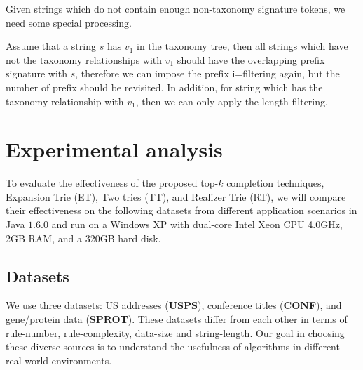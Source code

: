 \documentclass{sig-alternate}
\begin{document}
Given strings which do not contain enough non-taxonomy signature tokens, we need some special processing.

Assume that a string $s$ has $v_1$ in the taxonomy tree, then all strings which have not the taxonomy relationships with $v_1$ should have the overlapping prefix signature with $s$, therefore we can impose the prefix i=filtering again, but the number of prefix should be revisited. In addition, for string which has the taxonomy relationship with $v_1$, then we can only apply the length filtering.




\section{Experimental analysis}

To evaluate the effectiveness of the proposed top-$k$ completion
techniques, Expansion Trie (ET), Two tries (TT), and  Realizer Trie (RT), we will compare
their effectiveness on the following datasets from different
application scenarios in Java $1.6.0$ and run on a
Windows XP with dual-core Intel Xeon CPU 4.0GHz, 2GB RAM, and a 320GB hard disk.


\subsection{Datasets}
We use three datasets: US addresses (\textbf{USPS}),
conference titles  (\textbf{CONF}), and gene/protein data
(\textbf{SPROT}). These datasets differ from each other in terms of rule-number, rule-complexity, data-size and string-length. Our goal in choosing these diverse sources is to understand the usefulness of algorithms in different real world environments.
\end{document}
